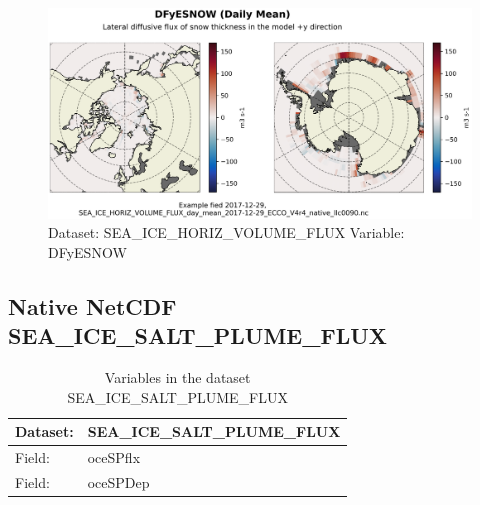 \begin{figure}[H]
\centering
\includegraphics[width=\textwidth]{../images/plots/native_plots/Sea-Ice_and_Snow_Horizontal_Volume_Fluxes/DFyESNOW.png}
\caption{Dataset: SEA\_ICE\_HORIZ\_VOLUME\_FLUX Variable: DFyESNOW}
\label{tab:table-SEA_ICE_HORIZ_VOLUME_FLUX_DFyESNOW-Plot}
\end{figure}
\pagebreak
\subsection{Native NetCDF SEA\_ICE\_SALT\_PLUME\_FLUX}
\newp
\begin{longtable}{|p{}|p{}|}
\caption{Variables in the dataset SEA\_ICE\_SALT\_PLUME\_FLUX}
\label{tab:table-SEA_ICE_SALT_PLUME_FLUX-fields} \\ 
\hline \endhead \hline \endfoot
\rowcolor{lightgray} \textbf{Dataset:} & \textbf{SEA\_ICE\_SALT\_PLUME\_FLUX} \\ \hline
Field: &oceSPflx \\ \hline
Field: &oceSPDep \\ \hline
\end{longtable}

\pagebreak
